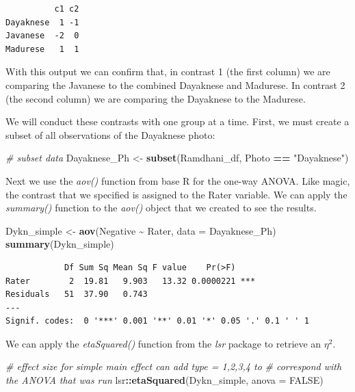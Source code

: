 \documentclass[
  11pt,
]{book}
\newenvironment{Shaded}{\begin{snugshade}}{\end{snugshade}}
\newcommand{\AttributeTok}[1]{\textcolor[rgb]{0.27,0.27,0.27}{#1}}
\newcommand{\CommentTok}[1]{\textcolor[rgb]{0.37,0.37,0.37}{\textit{#1}}}
\newcommand{\ConstantTok}[1]{\textcolor[rgb]{0.37,0.37,0.37}{#1}}
\newcommand{\FunctionTok}[1]{\textcolor[rgb]{0.27,0.27,0.27}{\textbf{#1}}}
\newcommand{\NormalTok}[1]{#1}
\newcommand{\OtherTok}[1]{\textcolor[rgb]{0.37,0.37,0.37}{#1}}
\newcommand{\SpecialCharTok}[1]{\textcolor[rgb]{0.43,0.43,0.43}{\textbf{#1}}}
\newcommand{\StringTok}[1]{\textcolor[rgb]{0.5,0.5,0.5}{#1}}
\begin{document}
\begin{verbatim}
          c1 c2
Dayaknese  1 -1
Javanese  -2  0
Madurese   1  1
\end{verbatim}

With this output we can confirm that, in contrast 1 (the first column) we are comparing the Javanese to the combined Dayaknese and Madurese. In contrast 2 (the second column) we are comparing the Dayaknese to the Madurese.

We will conduct these contrasts with one group at a time. First, we must create a subset of all observations of the Dayaknese photo:

\begin{Shaded}
\begin{Highlighting}[]
\CommentTok{\# subset data}
\NormalTok{Dayaknese\_Ph }\OtherTok{\textless{}{-}} \FunctionTok{subset}\NormalTok{(Ramdhani\_df, Photo }\SpecialCharTok{==} \StringTok{"Dayaknese"}\NormalTok{)}
\end{Highlighting}
\end{Shaded}

Next we use the \emph{aov()} function from base R for the one-way ANOVA. Like magic, the contrast that we specified is assigned to the Rater variable. We can apply the \emph{summary()} function to the \emph{aov()} object that we created to see the results.

\begin{Shaded}
\begin{Highlighting}[]
\NormalTok{Dykn\_simple }\OtherTok{\textless{}{-}} \FunctionTok{aov}\NormalTok{(Negative }\SpecialCharTok{\textasciitilde{}}\NormalTok{ Rater, }\AttributeTok{data =}\NormalTok{ Dayaknese\_Ph) }
\FunctionTok{summary}\NormalTok{(Dykn\_simple) }
\end{Highlighting}
\end{Shaded}

\begin{verbatim}
            Df Sum Sq Mean Sq F value    Pr(>F)    
Rater        2  19.81   9.903   13.32 0.0000221 ***
Residuals   51  37.90   0.743                      
---
Signif. codes:  0 '***' 0.001 '**' 0.01 '*' 0.05 '.' 0.1 ' ' 1
\end{verbatim}

We can apply the \emph{etaSquared()} function from the \emph{lsr} package to retrieve an \(\eta^2\).

\begin{Shaded}
\begin{Highlighting}[]
\CommentTok{\# effect size for simple main effect can add \textquotesingle{}type = 1,2,3,4\textquotesingle{} to}
\CommentTok{\# correspond with the ANOVA that was run}
\NormalTok{lsr}\SpecialCharTok{::}\FunctionTok{etaSquared}\NormalTok{(Dykn\_simple, }\AttributeTok{anova =} \ConstantTok{FALSE}\NormalTok{)}
\end{Highlighting}
\end{Shaded}
\end{document}

